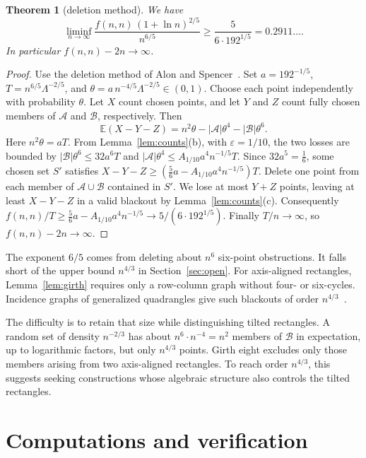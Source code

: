 \documentclass[12pt]{article}
\theoremstyle{plain}
\newtheorem{theorem}{Theorem}
\theoremstyle{definition}
\theoremstyle{remark}
\begin{document}
\begin{theorem}[deletion method]\label{thm:alteration}
We have
\[
\liminf_{n\to\infty}\frac{f(n,n)\,(1+\ln n)^{2/5}}{n^{6/5}}\ge\frac5{6\cdot192^{1/5}}=0.2911\ldots.
\]
In particular $f(n,n)-2n\to\infty$.
\end{theorem}

\begin{proof}
Use the deletion method of Alon and Spencer~\cite[Section~3.2]{alonspencer2016}.
Set $a=192^{-1/5}$, $T=n^{6/5}\Lambda^{-2/5}$, and
$\theta=a\,n^{-4/5}\Lambda^{-2/5}\in(0,1)$.
Choose each point independently with probability $\theta$.
Let $X$ count chosen points, and let $Y$ and $Z$ count fully chosen
members of $\mathcal A$ and $\mathcal B$, respectively. Then
\[
\mathbb E(X-Y-Z)=n^2\theta-|\mathcal A|\theta^4-|\mathcal B|\theta^6 .
\]
Here $n^2\theta=aT$. From Lemma~\ref{lem:counts}(b),
with $\varepsilon=1/10$, the two losses are bounded by
$|\mathcal B|\theta^6\le32a^6T$ and
$|\mathcal A|\theta^4\le A_{1/10}a^4n^{-1/5}T$.
Since $32a^5=\frac16$, some chosen set $S'$ satisfies
$X-Y-Z\ge(\frac56a-A_{1/10}a^4n^{-1/5})T$.
Delete one point from each member of $\mathcal A\cup\mathcal B$ contained
in $S'$. We lose at most $Y+Z$ points, leaving at least $X-Y-Z$ in a
valid blackout by Lemma~\ref{lem:counts}(c).
Consequently
$f(n,n)/T\ge\frac56a-A_{1/10}a^4n^{-1/5}\to5/(6\cdot192^{1/5})$.
Finally $T/n\to\infty$, so $f(n,n)-2n\to\infty$.
\end{proof}

The exponent $6/5$ comes from deleting about $n^6$ six-point obstructions.
It falls short of the upper bound $n^{4/3}$ in Section~\ref{sec:open}.
For axis-aligned rectangles, Lemma~\ref{lem:girth} requires only a row-column
graph without four- or six-cycles. Incidence graphs of generalized quadrangles
give such blackouts of order $n^{4/3}$~\cite{benson1966}.

The difficulty is to retain that size while distinguishing tilted rectangles.
A random set of density $n^{-2/3}$ has about $n^6\cdot n^{-4}=n^2$ members
of $\mathcal B$ in expectation, up to logarithmic factors, but only $n^{4/3}$
points. Girth eight excludes only those members arising from two axis-aligned
rectangles. To reach order $n^{4/3}$, this suggests seeking constructions
whose algebraic structure also controls the tilted rectangles.
\section{Computations and verification}\label{sec:verify}
\end{document}
